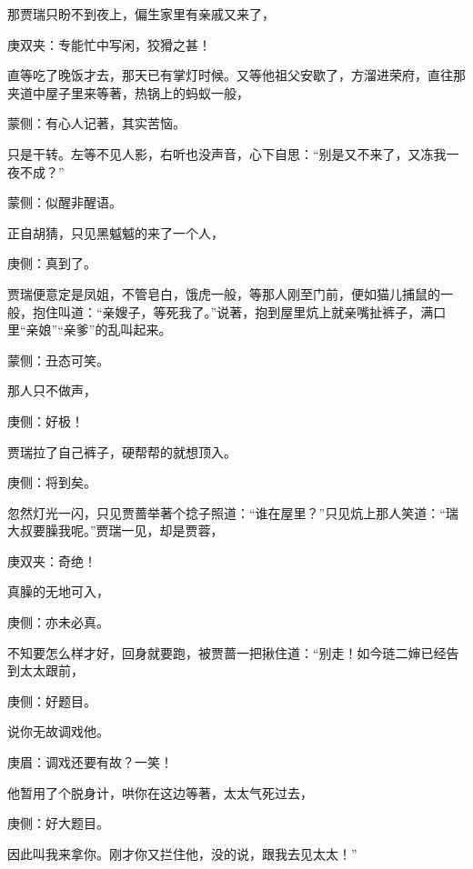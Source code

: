 \begin{parag}
    那贾瑞只盼不到夜上，偏生家里有亲戚又来了，\begin{note}庚双夹：专能忙中写闲，狡猾之甚！\end{note}直等吃了晚饭才去，那天已有掌灯时候。又等他祖父安歇了，方溜进荣府，直往那夹道中屋子里来等著，热锅上的蚂蚁一般，\begin{note}蒙侧：有心人记著，其实苦恼。\end{note}只是干转。左等不见人影，右听也没声音，心下自思：“别是又不来了，又冻我一夜不成？”\begin{note}蒙侧：似醒非醒语。\end{note}正自胡猜，只见黑魆魆的来了一个人，\begin{note}庚侧：真到了。\end{note}贾瑞便意定是凤姐，不管皂白，饿虎一般，等那人刚至门前，便如猫儿捕鼠的一般，抱住叫道：“亲嫂子，等死我了。”说著，抱到屋里炕上就亲嘴扯裤子，满口里“亲娘”“亲爹”的乱叫起来。\begin{note}蒙侧：丑态可笑。\end{note}那人只不做声，\begin{note}庚侧：好极！\end{note}贾瑞拉了自己裤子，硬帮帮的就想顶入。\begin{note}庚侧：将到矣。\end{note}忽然灯光一闪，只见贾蔷举著个捻子照道：“谁在屋里？”只见炕上那人笑道：“瑞大叔要臊我呢。”贾瑞一见，却是贾蓉，\begin{note}庚双夹：奇绝！\end{note}真臊的无地可入，\begin{note}庚侧：亦未必真。\end{note}不知要怎么样才好，回身就要跑，被贾蔷一把揪住道：“别走！如今琏二婶已经告到太太跟前，\begin{note}庚侧：好题目。\end{note}说你无故调戏他。\begin{note}庚眉：调戏还要有故？一笑！\end{note}他暂用了个脱身计，哄你在这边等著，太太气死过去，\begin{note}庚侧：好大题目。\end{note}因此叫我来拿你。刚才你又拦住他，没的说，跟我去见太太！”
\end{parag}


